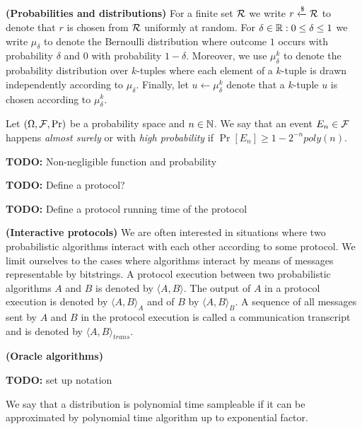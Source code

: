 \textbf{(Probabilities and distributions)}
For a finite set $\mathcal{R}$ we write $r \xleftarrow{\$} \mathcal{R}$ to denote that $r$ is chosen from $\mathcal{R}$ uniformly at random.
For $\delta \in \mathbb{R} : 0 \leq \delta \leq 1$ we write $\mu_{\delta}$ to denote the Bernoulli distribution where outcome $1$ occurs with
probability $\delta$ and $0$ with probability $1-\delta$.
Moreover, we use $\mu_{\delta}^k$ to denote the probability distribution over $k$-tuples
where each element of a $k$-tuple is drawn independently according to $\mu_{\delta}$.
Finally, let $u \leftarrow \mu_{\delta}^k$ denote that a $k$-tuple $u$ is chosen according to $\mu_{\delta}^k$.

Let $(\Omega, \mathcal{F}, \Pr)$ be a probability space and $n \in \mathbb{N}$. We say that an event $E_n \in \mathcal{F}$
happens \textit{almost surely} or with \textit{high probability} if $\Pr[E_n] \geq 1 - 2^{-n} \mathit{poly}(n)$.

\begin{todo}
  \textbf{TODO:} Non-negligible function and probability
\end{todo}

\begin{todo}
  \textbf{TODO:} Define a protocol?
\end{todo}

\begin{todo}
  \textbf{TODO:} Define a protocol running time of the protocol
\end{todo}

\textbf{(Interactive protocols)} We are often interested in situations where two probabilistic algorithms interact with each other according to some protocol.
We limit ourselves to the cases where algorithms interact by means of messages representable by bitstrings.
A protocol execution between two probabilistic algorithms $A$ and $B$ is denoted by $\langle A, B \rangle$.
The output of $A$ in a protocol execution is denoted by $\langle A, B \rangle_A$ and of $B$ by $\langle A, B \rangle_B$.
A sequence of all messages sent by $A$ and $B$ in the protocol execution is called a communication transcript and
is denoted by $\langle A, B \rangle_{\mathit{trans}}$.

\textbf{(Oracle algorithms)}
\begin{todo}
  \textbf{TODO:} set up notation
\end{todo}

\begin{definition}
We say that a distribution is polynomial time sampleable if it can be approximated by polynomial time algorithm
up to exponential factor.
\end{definition}

